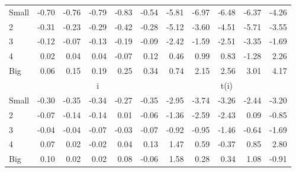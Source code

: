 \begin{table}[!ht]
\begin{tabular}{lrrrrrrrrrr}
    \\
      \cmidrule(r){2-6} \cmidrule(r){7-11}

    Small   & -0.70  & -0.76  & -0.79  & -0.83  & -0.54  & -5.81  & -6.97  & -6.48  & -6.37  & -4.26  \\
         2  & -0.31  & -0.23  & -0.29  & -0.42  & -0.28  & -5.12  & -3.60  & -4.51  & -5.71  & -3.55  \\
         3  & -0.12  & -0.07  & -0.13  & -0.19  & -0.09  & -2.42  & -1.59  & -2.51  & -3.35  & -1.69  \\
         4  & 0.02  & 0.04  & 0.04  & -0.07  & 0.12  & 0.46  & 0.99  & 0.83  & -1.28  & 2.26  \\
    Big     & 0.06  & 0.15  & 0.19  & 0.25  & 0.34  & 0.74  & 2.15  & 2.56  & 3.01  & 4.17  \\

  
    
      & \multicolumn{5}{c}{i} & \multicolumn{5}{c}{t(i)}
    
    \\
      \cmidrule(r){2-6} \cmidrule(r){7-11}

    Small   & -0.30  & -0.35  & -0.34  & -0.27  & -0.35  & -2.95  & -3.74  & -3.26  & -2.44  & -3.20  \\
         2  & -0.07  & -0.14  & -0.14  & 0.01  & -0.06  & -1.36  & -2.59  & -2.43  & 0.09  & -0.85  \\
         3  & -0.04  & -0.04  & -0.07  & -0.03  & -0.07  & -0.92  & -0.95  & -1.46  & -0.64  & -1.69  \\
         4  & 0.07  & 0.02  & -0.02  & 0.04  & 0.13  & 1.47  & 0.59  & -0.37  & 0.85  & 2.80  \\
    Big     & 0.10  & 0.02  & 0.02  & 0.08  & -0.06  & 1.58  & 0.28  & 0.34  & 1.08  & -0.91  \\

  

  \bottomrule
\end{tabular}
\label{tbl:25_Size_Prior_FF2016}
\end{table}